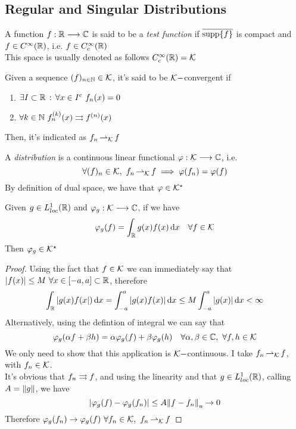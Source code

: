 \documentclass[../complete.tex]{subfiles}
\begin{document}
\subsection{Regular and Singular Distributions}
\begin{dfn}
	A function $f:\mathbb{R}\overset{}{\longrightarrow}\mathbb{C}$ is said to be a \textit{test function} if $\overline{\operatorname{supp}\{f\}}$ is compact and $f\in C^\infty(\mathbb{R})$, i.e. $f\in C_c^\infty(\mathbb{R})$\\
	This space is usually denoted as follows $C^\infty_c(\mathbb{R})=\mathcal{K}$
\end{dfn}
\begin{dfn}[$\K$-convergence]
	Given a sequence $(f)_{n\in\mathbb{N}}\in\mathcal{K}$, it's said to be $\mathcal{K}-$convergent if
	\begin{enumerate}
	\item $\exists I\subset\mathbb{R}\, :\, \forall x\in I^{\mathrm{c}}\ f_n(x)=0$
	\item $\forall k\in\mathbb{N}\ f^{(k)}_n(x)\rightrightarrows f^{(n)}(x) $
	\end{enumerate}
	Then, it's indicated as $f_n\operatorname{\rightharpoonup_{\mathcal{K}}} f$
\end{dfn}
\begin{dfn}[Distribution]
	A \textit{distribution} is  a continuous linear functional $\varphi:\mathcal{K}\overset{}{\longrightarrow}\mathbb{C}$, i.e.
	\begin{equation*}
		\forall(f)_n\in\mathcal{K},\ f_n\operatorname{\rightharpoonup_{\mathcal{K}}} f\implies\varphi(f_n)=\varphi(f)
	\end{equation*}
	By definition of dual space, we have that $\varphi\in\mathcal{K}^\star$
\end{dfn}
\begin{thm}
	Given $g\in L^1_{loc}(\mathbb{R})$ and $\varphi_g:\mathcal{K}\overset{}{\longrightarrow}\mathbb{C}$, if we have
	\begin{equation*}
		\varphi_g(f)=\int_{\mathbb{R}}^{}g(x)f(x)\operatorname{d\!} x\quad\forall f\in\mathcal{K}
	\end{equation*}
	Then $\varphi_g\in\mathcal{K}^\star$
\end{thm}
\begin{proof}
	Using the fact that $f\in\mathcal{K}$ we can immediately say that $\abs{f(x)}\le M\ \forall x\in[-a,a]\subset\mathbb{R}$, therefore
	\begin{equation*}
		\int_{\mathbb{R}}^{}\abs{g(x)f(x})\operatorname{d\!} x=\int_{-a}^{a}\abs{g(x)f(x)}\operatorname{d\!} x\le M\int_{-a}^{a}\abs{g(x)}\operatorname{d\!} x<\infty
	\end{equation*}
	Alternatively, using the defintion of integral we can say that
	\begin{equation*}
		\varphi_g(\alpha f+\beta h)=\alpha\varphi_g(f)+\beta\varphi_g(h)\quad\forall\alpha,\beta\in\Cf,\ \forall f,h\in\K
	\end{equation*}
	We only need to show that this application is $\mathcal{K}-$continuous. I take $f_n\operatorname{\rightharpoonup_{\mathcal{K}}} f$, with $f_n\in\mathcal{K}$.\\
	It's obvious that $f_n\rightrightarrows f$, and using the linearity and that $g\in L^1_{loc}(\mathbb{R})$, calling $A=\norm{g}$, we have
	\begin{equation*}
		\abs{\varphi_g(f)-\varphi_g(f_n)}\le A\norm{f-f_n}_u\to0
	\end{equation*}
	Therefore $\varphi_g(f_n)\to\varphi_g(f)\ \forall f_n\in\K,\ f_n\kto f$
\end{proof}
\end{document}
